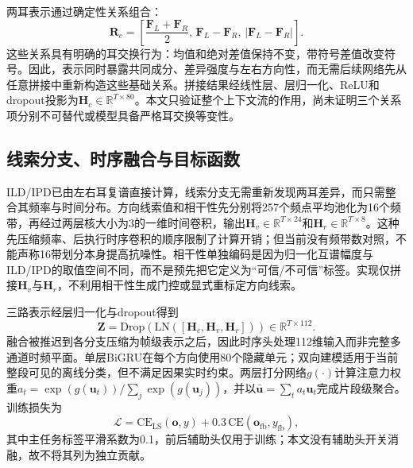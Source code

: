 \documentclass{article}
\begin{document}
两耳表示通过确定性关系组合：
\begin{equation}
 \mathbf{R}_c=\left[\frac{\mathbf{F}_L+\mathbf{F}_R}{2},\,
 \mathbf{F}_L-\mathbf{F}_R,\,|\mathbf{F}_L-\mathbf{F}_R|\right].
\end{equation}
这些关系具有明确的耳交换行为：均值和绝对差值保持不变，带符号差值改变符号。因此，表示同时暴露共同成分、差异强度与左右方向性，而无需后续网络先从任意拼接中重新构造这些基础关系。拼接结果经线性层、层归一化、ReLU和dropout投影为$\mathbf{H}_c\in\mathbb{R}^{T\times80}$。本文只验证整个上下文流的作用，尚未证明三个关系项分别不可替代或模型具备严格耳交换等变性。

\subsection{线索分支、时序融合与目标函数}

ILD/IPD已由左右耳复谱直接计算，线索分支无需重新发现两耳差异，而只需整合其频率与时间分布。方向线索值和相干性先分别将257个频点平均池化为16个频带，再经过两层核大小为3的一维时间卷积，输出$\mathbf{H}_v\in\mathbb{R}^{T\times24}$和$\mathbf{H}_r\in\mathbb{R}^{T\times8}$。这种先压缩频率、后执行时序卷积的顺序限制了计算开销；但当前没有频带数对照，不能声称16带划分本身提高抗噪性。相干性单独编码是因为归一化互谱幅度与ILD/IPD的取值空间不同，而不是预先把它定义为“可信/不可信”标签。实现仅拼接$\mathbf{H}_v$与$\mathbf{H}_r$，不利用相干性生成门控或显式重标定方向线索。

三路表示经层归一化与dropout得到
\begin{equation}
 \mathbf{Z}=\mathrm{Drop}\!\left(\mathrm{LN}([\mathbf{H}_c,\mathbf{H}_v,\mathbf{H}_r])\right)
 \in\mathbb{R}^{T\times112}.
\end{equation}
融合被推迟到各分支压缩为帧级表示之后，因此时序头处理112维输入而非完整多通道时频平面。单层BiGRU在每个方向使用80个隐藏单元；双向建模适用于当前整段可见的离线分类，但不满足因果实时约束。两层打分网络$g(\cdot)$计算注意力权重$a_t=\exp(g(\mathbf{u}_t))/\sum_j\exp(g(\mathbf{u}_j))$，并以$\bar{\mathbf{u}}=\sum_ta_t\mathbf{u}_t$完成片段级聚合。训练损失为
\begin{equation}
 \mathcal{L}=\mathrm{CE}_{\mathrm{LS}}(\mathbf{o},y)
 +0.3\,\mathrm{CE}(\mathbf{o}_{\mathrm{fb}},y_{\mathrm{fb}}),
\end{equation}
其中主任务标签平滑系数为0.1，前后辅助头仅用于训练；本文没有辅助头开关消融，故不将其列为独立贡献。
\end{document}
